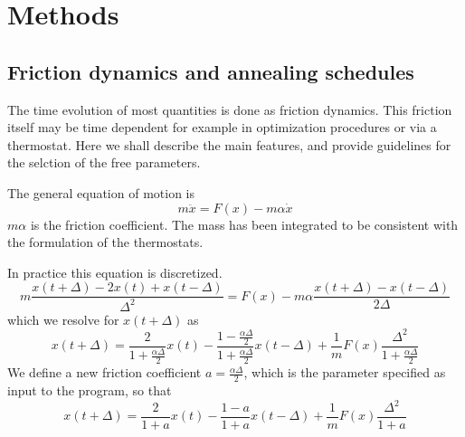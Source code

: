 \documentclass[final,12pt]{article}
\begin{document}
{{{{{{%
\newpage
\section{Methods}
\label{methods}
\subsection{Friction dynamics and annealing schedules}

The time evolution of most quantities is done as friction dynamics.
This friction itself may be time dependent for example in optimization
procedures or via a thermostat. Here we shall describe the main
features, and provide guidelines for the selction of the free
parameters.

The general equation of motion is 
\begin{displaymath}
m\ddot{x}=F(x)-m\alpha\dot{x}
\end{displaymath}
$m\alpha$ is the friction coefficient. The mass has been integrated to
be consistent with the formulation of the thermostats.

In practice this equation is discretized.
\begin{displaymath}
m\frac{x(t+\Delta)-2x(t)+x(t-\Delta)}{\Delta^2}
=F(x)-m\alpha\frac{x(t+\Delta)-x(t-\Delta)}{2\Delta}
\end{displaymath}
which we resolve for $x(t+\Delta)$ as
\begin{displaymath}
x(t+\Delta)=
\frac{2}{1+\frac{\alpha\Delta}{2}}x(t)
-\frac{1-\frac{\alpha\Delta}{2}}{1+\frac{\alpha\Delta}{2}}x(t-\Delta)
+\frac{1}{m}F(x)\frac{\Delta^2}{1+\frac{\alpha\Delta}{2}}
\end{displaymath}
We define a new friction coefficient $a=\frac{\alpha\Delta}{2}$, which is the
parameter specified as input to the program, so that
\begin{displaymath}
x(t+\Delta)=\frac{2}{1+a}x(t)-\frac{1-a}{1+a}x(t-\Delta)
+\frac{1}{m}F(x)\frac{\Delta^2}{1+a}
\end{displaymath}

}}}}}}
\end{document}
